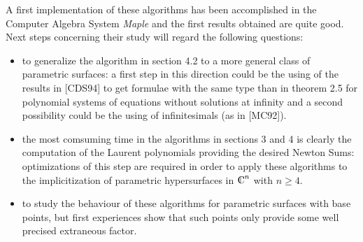A first implementation of these algorithms has been accomplished in
the Computer Algebra System {\it Maple} and the first results
obtained are quite good. Next steps concerning their study will
regard the following questions:
\begin{itemize}
\item to generalize the algorithm in section 4.2 to a more general
class of parametric surfaces: a first step in this direction could be
the using of the results in [CDS94] to get formulae with the same
type than in theorem 2.5 for polynomial systems of equations without
solutions at infinity and a second possibility could be the using of
infinitesimals (as in [MC92]).
\item the most comsuming time in the algorithms in sections 3 and 4 
is clearly the computation of the Laurent polynomials providing the
desired Newton Sums: optimizations of this step are required in order
to apply these algorithms to the implicitization of parametric
hypersurfaces in
$\C^n$ with $n\geq 4$.
\item to study the behaviour of these algorithms for parametric
surfaces with base points, but first experiences show that such
points only provide some well precised extraneous factor.
\end{itemize}


